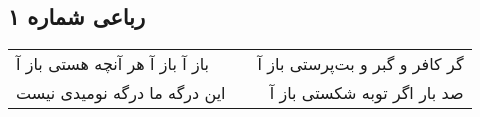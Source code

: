 \begin{center}
\section*{رباعی شماره ۱}
\label{sec:sh001}
\begin{longtable}{l p{0.5cm} r}
باز آ باز آ هر آنچه هستی باز آ
&&
گر کافر و گبر و بت‌پرستی باز آ
\\
این درگه ما درگه نومیدی نیست
&&
صد بار اگر توبه شکستی باز آ
\\
\end{longtable}
\end{center}

